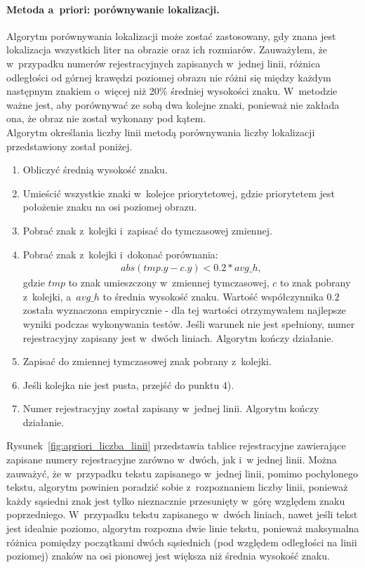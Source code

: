 \paragraph{Metoda a~priori: porównywanie lokalizacji.} Algorytm porównywania lokalizacji może zostać zastosowany, gdy znana jest lokalizacja wszystkich liter na obrazie oraz ich rozmiarów. Zauważyłem, że w~przypadku numerów rejestracyjnych zapisanych w~jednej linii, różnica odległości od górnej krawędzi poziomej obrazu nie różni się między każdym następnym znakiem o~więcej niż 20\% średniej wysokości znaku. W~metodzie ważne jest, aby porównywać ze sobą dwa kolejne znaki, ponieważ nie zakłada ona, że obraz nie został wykonany pod kątem.\\
Algorytm określania liczby linii metodą porównywania liczby lokalizacji przedstawiony został poniżej.
\begin{enumerate}
  \item Obliczyć średnią wysokość znaku.
  \item Umieścić wszystkie znaki w~kolejce priorytetowej, gdzie priorytetem jest położenie znaku na osi poziomej obrazu.
  \item Pobrać znak z~kolejki i~zapisać do tymczasowej zmiennej.
  \item Pobrać znak z~kolejki i~dokonać porównania:
    \begin{gather*}
      abs(tmp.y - c.y) < 0.2*avg\_h,
    \end{gather*}
    gdzie $tmp$ to znak umieszczony w~zmiennej tymczasowej, $c$ to znak pobrany z~kolejki, a~$avg\_h$ to średnia wysokość znaku. Wartość współczynnika $0.2$ została wyznaczona empirycznie - dla tej wartości otrzymywałem najlepsze wyniki podczas wykonywania testów. Jeśli warunek nie jest spełniony, numer rejestracyjny zapisany jest w~dwóch liniach. Algorytm kończy działanie.
  \item Zapisać do zmiennej tymczasowej znak pobrany z~kolejki.
  \item Jeśli kolejka nie jest pusta, przejść do punktu 4).
  \item Numer rejestracyjny został zapisany w~jednej linii. Algorytm kończy działanie.
\end{enumerate}
Rysunek~\ref{fig:apriori_liczba_linii} przedstawia tablice rejestracyjne zawierające zapisane numery rejestracyjne zarówno w~dwóch, jak i~w jednej linii. Można zauważyć, że w~przypadku tekstu zapisanego w~jednej linii, pomimo pochylonego tekstu, algorytm powinien poradzić sobie z~rozpoznaniem liczby linii, ponieważ każdy sąsiedni znak jest tylko nieznacznie przesunięty w~górę względem znaku poprzedniego. W~przypadku tekstu zapisanego w~dwóch liniach, nawet jeśli tekst jest idealnie poziomo, algorytm rozpozna dwie linie tekstu, ponieważ maksymalna różnica pomiędzy początkami dwóch sąsiednich (pod względem odległości na linii poziomej) znaków na osi pionowej jest większa niż średnia wysokość znaku.

